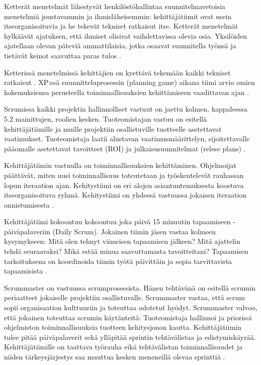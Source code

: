 \documentclass[finnish]{tktltiki2}
\theoremstyle{definition}
\theoremstyle{remark}
\begin{document}
Ketterät menetelmät lähestyvät henkilöstöhallintaa suunnitelmavetoisia menetelmiä joustavammin ja ihmisläheisemmin: kehittäjätiimit ovat usein itseorganisoituvia ja he tekevät tekniset ratkaisut itse. Ketterät menetelmät hylkäävät ajatuksen, että ihmiset olisivat vaihdettavissa olevia osia. Yksilöiden ajatellaan olevan päteviä ammattilaisia, jotka osaavat suunnitella työnsä ja tietävät keinot saavuttaa paras tulos \cite{FOW01a}.

Ketterissä menetelmissä kehittäjien on kyettävä tekemään kaikki tekniset ratkaisut \cite{FOW01a}. XP:ssä suunnitteluprosessin (planning game) aikana tiimi arvio omien kokemuksiensa perusteella toiminnallisuuksien kehittämiseen vaadittavan ajan \cite{BEC99}.

Scrumissa kaikki projektin hallinnolliset vastuut on jaettu kolmen, kappaleessa 5.2 mainittujen, roolien kesken. Tuoteomistajan vastuu on esitellä kehittäjätiimille ja muille projektiin osallistuville tuotteelle asetettavat vaatimukset. Tuoteomistaja laatii alustavan vaatimusmäärittelyn, sijoitettavalle pääomalle asetettavat tavoitteet (ROI) ja julkaisusuunnitelmat (relese plans) \cite{SCH09}.

Kehittäjätiimin vastuulla on toiminnallisuuksien kehittäminen. Ohjelmoijat päättävät, miten uusi toiminnallisuus toteutetaan ja työskentelevät rauhassan lopun iteraation ajan. Kehitystiimi on eri alojen asiantuntemuksesta koostuva itseorganisoituva ryhmä. Kehitystiimi on yhdessä vastuussa jokaisen iteraation onnistumisesta \cite{SCH09}.

Kehittäjätiimi kokoontuu kokoontuu joka päivä 15 minuutin tapaamiseen - päiväpalaveriin (Daily Scrum). Jokainen tiimin jäsen vastaa kolmeen kysymykseen: Mitä olen tehnyt viimeisen tapaamisen jälkeen? Mitä ajattelin tehdä seuraavaksi? Mikä estää minua saavuttamasta tavoitteitani? Tapaamisen tarkoituksena on koordinoida tiimin työtä päivittäin ja sopia tarvittavista tapaamisista \cite{SCH09}.

Scrummaster on vastuussa scrumprosessista. Hänen tehtävänä on esitellä scrumin periaatteet jokaiselle projektiin osallistuvalle. Scrummaster vastaa, että scrum sopii organisaation kulttuuriin ja toteuttaa odotetut hyödyt. Scrummaster valvoo, että jokainen toteuttaa scrumin käytänteitä: Tuoteomistaja hallinnoi ja priorisoi ohjelmiston toiminnallisuuksia tuotteen kehitysjonon kautta. Kehittäjätiimin tulee pitää päiväpalaverit sekä ylläpitää sprintin tehtävälistaa ja edistymiskäyrää. Kehittäjätiimille on taattava työrauha eikä tehtävälistan toiminnallisuudet ja niiden tärkeysjärjestys saa muuttua kesken meneneillä olevaa sprinttiä \cite{SCH09}.
\end{document}
